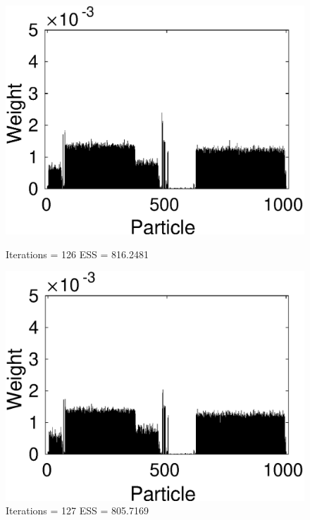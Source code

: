 \documentclass[12pt]{article}
\begin{document}
\begin{figure}[!t]
\centering
	\begin{minipage}{0.5\textwidth}
		\centering
		\includegraphics[scale = 0.4]{./Figures/126.eps}
		\caption*{Iterations = 126 ESS = 816.2481}
	\end{minipage}%
	\begin{minipage}{0.5\textwidth}
		\centering
		\includegraphics[scale = 0.4]{./Figures/127.eps}
		\caption*{Iterations = 127 ESS = 805.7169}
	\end{minipage}
	\begin{minipage}{0.5\textwidth}
		\centering

\end{minipage}
\end{figure}
\end{document}
